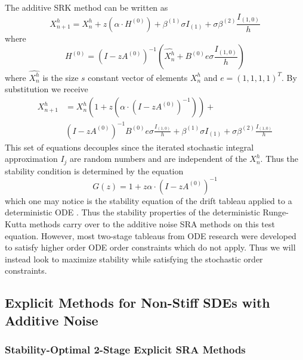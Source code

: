 \documentclass{article}
\begin{document}
The additive SRK method can be written as
\begin{equation}
X_{n+1}^{h}=X_{n}^{h}+z\left(\alpha\cdot H^{(0)}\right)+\beta^{(1)}\sigma I_{(1)}+\sigma\beta^{(2)}\frac{I_{(1,0)}}{h}\label{eq:SRK_stab_step1}
\end{equation}
where
\begin{equation}
H^{(0)}=\left(I-zA^{(0)}\right)^{-1}\left(\hat{X_{n}^{h}}+B^{(0)}e\sigma\frac{I_{(1,0)}}{h}\right)\label{eq:SRK_stab_step}
\end{equation}
where $\hat{X_{n}^{h}}$ is the size $s$ constant vector of elements
$X_{n}^{h}$ and $e=\left(1,1,1,1\right)^{T}$. By substitution we
receive
\begin{align}
X_{n+1}^{h} & =X_{n}^{h}\left(1+z\left(\alpha\cdot\left(I-zA^{(0)}\right)^{-1}\right)\right)+\\
& \left(I-zA^{(0)}\right)^{-1}B^{(0)}e\sigma\frac{I_{(1,0)}}{h}+\beta^{(1)}\sigma I_{(1)}+\sigma\beta^{(2)}\frac{I_{(1,0)}}{h}\label{eq:SRK_stab_sub}
\end{align}
This set of equations decouples since the iterated stochastic integral
approximation $I_{j}$ are random numbers and are independent of the
$X_{n}^{h}$. Thus the stability condition is determined by the equation
\begin{equation}
G(z)=1+z\alpha\cdot\left(I-zA^{(0)}\right)^{-1}\label{eq:SRA_stab}
\end{equation}
which one may notice is the stability equation of the drift tableau
applied to a deterministic ODE \cite{RN3516}. Thus the stability
properties of the deterministic Runge-Kutta methods carry over to
the additive noise SRA methods on this test equation. However, most
two-stage tableaus from ODE research were developed to satisfy higher
order ODE order constraints which do not apply. Thus we will instead
look to maximize stability while satisfying the stochastic order constraints.

\subsection{Explicit Methods for Non-Stiff SDEs with Additive Noise}

\subsubsection{Stability-Optimal 2-Stage Explicit SRA Methods}
\end{document}
